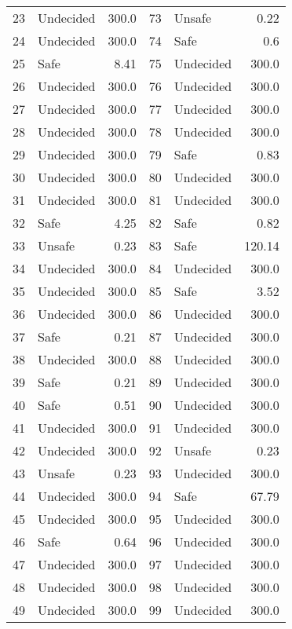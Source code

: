 \begin{table}[!ht]
\begin{tabular}{|llr|llr|}
    23 & Undecided & 300.0 &    73 & Unsafe & 0.22\\ 
    24 & Undecided & 300.0 &    74 & Safe & 0.6\\ 
    25 & Safe & 8.41 &    75 & Undecided & 300.0\\ 
    26 & Undecided & 300.0 &    76 & Undecided & 300.0\\ 
    27 & Undecided & 300.0 &    77 & Undecided & 300.0\\ 
    28 & Undecided & 300.0 &    78 & Undecided & 300.0\\ 
    29 & Undecided & 300.0 &    79 & Safe & 0.83\\ 
    30 & Undecided & 300.0 &    80 & Undecided & 300.0\\ 
    31 & Undecided & 300.0 &    81 & Undecided & 300.0\\ 
    32 & Safe & 4.25 &    82 & Safe & 0.82\\ 
    33 & Unsafe & 0.23 &    83 & Safe & 120.14\\ 
    34 & Undecided & 300.0 &    84 & Undecided & 300.0\\ 
    35 & Undecided & 300.0 &    85 & Safe & 3.52\\ 
    36 & Undecided & 300.0 &    86 & Undecided & 300.0\\ 
    37 & Safe & 0.21 &    87 & Undecided & 300.0\\ 
    38 & Undecided & 300.0 &    88 & Undecided & 300.0\\ 
    39 & Safe & 0.21 &    89 & Undecided & 300.0\\ 
    40 & Safe & 0.51 &    90 & Undecided & 300.0\\ 
    41 & Undecided & 300.0 &    91 & Undecided & 300.0\\ 
    42 & Undecided & 300.0 &    92 & Unsafe & 0.23\\ 
    43 & Unsafe & 0.23 &    93 & Undecided & 300.0\\ 
    44 & Undecided & 300.0 &    94 & Safe & 67.79\\ 
    45 & Undecided & 300.0 &    95 & Undecided & 300.0\\ 
    46 & Safe & 0.64 &    96 & Undecided & 300.0\\ 
    47 & Undecided & 300.0 &    97 & Undecided & 300.0\\ 
    48 & Undecided & 300.0 &    98 & Undecided & 300.0\\ 
    49 & Undecided & 300.0 &    99 & Undecided & 300.0\\ 
    \bottomrule
  \end{tabular}
\end{table}

